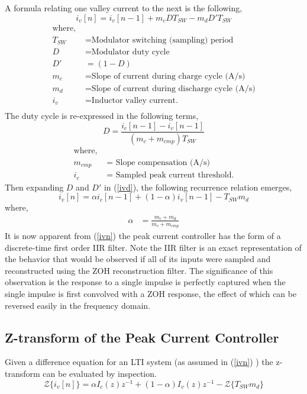 \documentclass[conference]{IEEEtran}
\begin{document}
A formula relating one valley current to the next is the following,
\begin{equation}
i_v[n] =  i_v[n-1] + m_c D T_{SW} - m_d  D' T_{SW}   \label{ivd}
\end{equation} 
\begin{align*}
\text{where, } \\
T_{SW} &= \text{Modulator switching (sampling) period} \\
D &= \text{Modulator duty cycle} \\
D' &= (1-D) \\
m_c &= \text{Slope of current during charge cycle (A/s)} \\
m_d &= \text{Slope of current during discharge cycle (A/s)}\\
i_v &= \text{Inductor valley current.} \\
\end{align*}
The duty cycle is re-expressed in the following terms,
\begin{equation}
D = \dfrac{i_c [n-1] - i_v [n-1]} {(m_c + m_{cmp})T_{SW}}
\end{equation}
\begin{align*}
\text{where, } \\
m_{cmp} &= \text{ Slope compensation (A/s)}\\
i_c &= \text{ Sampled peak current threshold.} 
\end{align*}
Then expanding $ D $ and $ D' $ in (\ref{ivd}), the following recurrence relation emerges,
\begin{equation}
i_v[n] =  \alpha i_c[n-1] + ( 1 - \alpha ) i_v [n-1] - T_{SW} m_d   \label{ivn}
\end{equation}
where,
\begin{align}
\alpha &= \frac{m_c + m_d} {m_c + m_{cmp}} \label{const_alpha}
\end{align}
It is now apparent from (\ref{ivn}) the peak current controller has the form of a discrete-time first order IIR filter. Note the IIR filter is an exact representation of the behavior that would be observed if all of its inputs were sampled and reconstructed using the ZOH reconstruction filter. The significance of this observation is the response to a single impulse is perfectly captured when the single impulse is first convolved with a ZOH response, the effect of which can be reversed easily in the frequency domain.

\subsection{Z-transform of the Peak Current Controller}
Given a difference equation for an LTI system (as assumed in (\ref{ivn}) ) the z-transform can be evaluated by inspection.  
\begin{equation}
\mathcal{Z} \{ i_v[n] \} =  \alpha I_c(z) z^{-1} + ( 1 - \alpha ) I_v (z) z^{-1} - \mathcal{Z} \{T_{SW}m_d\}  \label{ivz}
\end{equation}
\end{document}
